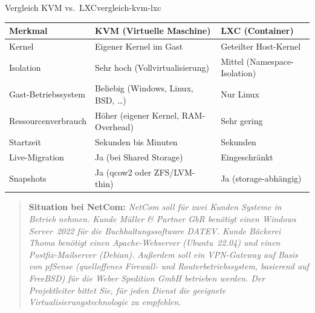 \documentclass[a4paper,10pt,addpoints]{exam}
\begin{document}
\begin{infoBox}{Vergleich KVM vs.\ LXC}{vergleich-kvm-lxc}
  \renewcommand{\arraystretch}{1.3}
  \begin{tabularx}{\textwidth}{lXX}
    \toprule
    \textbf{Merkmal}        & \textbf{KVM (Virtuelle Maschine)}           & \textbf{LXC (Container)} \\
    \midrule
    Kernel                  & Eigener Kernel im Gast                      & Geteilter Host-Kernel \\
    Isolation               & Sehr hoch (Vollvirtualisierung)             & Mittel (Namespace-Isolation) \\
    Gast-Betriebssystem     & Beliebig (Windows, Linux, BSD, \ldots)      & Nur Linux \\
    Ressourcenverbrauch     & Höher (eigener Kernel, RAM-Overhead)        & Sehr gering \\
    Startzeit               & Sekunden bis Minuten                        & Sekunden \\
    Live-Migration          & Ja (bei Shared Storage)                     & Eingeschränkt \\
    Snapshots               & Ja (qcow2 oder ZFS/LVM-thin)                & Ja (storage-abhängig) \\
    \bottomrule
  \end{tabularx}
  \renewcommand{\arraystretch}{1}
\end{infoBox}

\begin{quote}
  \textbf{Situation bei NetCom:}
  \itshape
  NetCom soll für zwei Kunden Systeme in Betrieb nehmen.
  Kunde \emph{Müller \& Partner GbR} benötigt einen Windows Server~2022
  für die Buchhaltungssoftware DATEV.
  Kunde \emph{Bäckerei Thoma} benötigt einen Apache-Webserver (Ubuntu~22.04)
  und einen Postfix-Mailserver (Debian).
  Außerdem soll ein VPN-Gateway auf Basis von pfSense
  (quelloffenes Firewall- und Routerbetriebssystem, basierend auf FreeBSD)
  für die Weber Spedition GmbH betrieben werden.
  Der Projektleiter bittet Sie, für jeden Dienst die geeignete
  Virtualisierungstechnologie zu empfehlen.
\end{quote}
\end{document}
